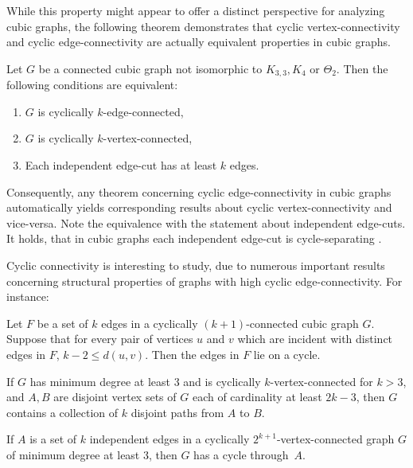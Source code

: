 \documentclass[12pt, twoside]{book}
\begin{document}
While this property might appear to offer a distinct perspective for analyzing cubic graphs, the following theorem demonstrates that cyclic \mbox{vertex-connectivity} and cyclic \mbox{edge-connectivity} are actually equivalent properties in cubic graphs.

\begin{theorem}\label{th:cyclic-vertex-edge-independent-equivalence}
	Let $G$ be a connected cubic graph not isomorphic to $K_{3,3},K_4$ or $\Theta_2$. Then the following conditions are equivalent:
	\begin{enumerate}[label=(\roman*)]
		\item $G$ is cyclically $k$-edge-connected,
		\item $G$ is cyclically $k$-vertex-connected,
		\item Each independent edge-cut has at least $k$ edges.
	\end{enumerate}
\end{theorem}

Consequently, any theorem concerning cyclic edge-connectivity in cubic graphs automatically yields corresponding results about cyclic vertex-connectivity and vice-versa. Note the equivalence with the statement about independent edge-cuts. It holds, that in cubic graphs each independent edge-cut is cycle-separating \cite{atoms-of-cyclic}.

Cyclic connectivity is interesting to study, due to numerous important results concerning structural properties of graphs with high cyclic edge-connectivity. For instance:

\begin{theorem}
	Let $F$ be a set of $k$ edges in a cyclically $(k + 1)$-connected cubic graph $G$. Suppose that for every pair of vertices $u$ and $v$ which are incident with distinct edges in $F$, $k - 2\leq d(u,v)$. Then the edges in $F$ lie on a cycle.
\end{theorem}

\begin{proposition}
	If $G$ has minimum degree at least 3 and is cyclically $k$-vertex-connected for $k > 3$, and $A, B$ are disjoint vertex sets of $G$ each of cardinality at least $2k - 3$, then $G$ contains a collection of $k$ disjoint paths from $A$ to $B$.
\end{proposition}

\begin{theorem}
	If $A$ is a set of $k$ independent edges in a cyclically $2^{k+1}$-vertex-connected graph $G$ of minimum degree at least 3, then $G$ has a cycle \mbox{through $A$}.
\end{theorem}
\end{document}
